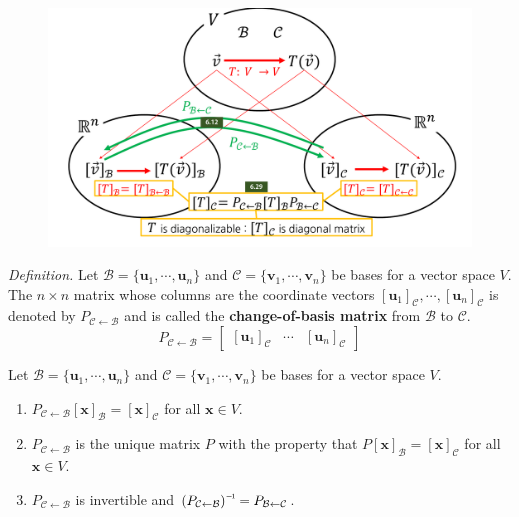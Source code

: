 \begin{figure}[H]
	\begin{center}
		\includegraphics[scale = 0.4]{Figure2.pdf}
	\end{center}
\end{figure}

\newpage
\textit{Definition.} Let $\mathcal{B} = \{ \textbf{u}_1, \cdots, \textbf{u}_n \}$ and $\mathcal{C} = \{ \textbf{v}_1, \cdots, \textbf{v}_n \}$ be bases for a vector space $V$. The $n \times n$ matrix whose columns are the coordinate vectors $[\textbf{u}_1]_\mathcal{C}, \cdots, [\textbf{u}_n]_\mathcal{C}$ is denoted by $P_{\mathcal{C} \leftarrow \mathcal{B}}$ and is called the \textbf{change-of-basis matrix} from $\mathcal{B}$ to $\mathcal{C}$. \begin{equation*}
	P_{\mathcal{C} \leftarrow \mathcal{B}} = \begin{bmatrix}
		\left [ \textbf{u}_1 \right ]_\mathcal{C} & \cdots & \left [ \textbf{u}_n \right ]_\mathcal{C}
	\end{bmatrix}
\end{equation*}

\begin{theorem}
	Let $\mathcal{B} = \{ \textbf{u}_1, \cdots, \textbf{u}_n \}$ and $\mathcal{C} = \{ \textbf{v}_1, \cdots, \textbf{v}_n \}$ be bases for a vector space $V$.
	\begin{enumerate}
		\item $P_{\mathcal{C} \leftarrow \mathcal{B}}[\textbf{x}]_\mathcal{B} = [\textbf{x}]_\mathcal{C}$ for all $\textbf{x} \in V$.
		\item $P_{ \mathcal{C} \leftarrow \mathcal{B} }$ is the unique matrix $P$ with the property that $P[\textbf{x}]_\mathcal{B} = [\textbf{x}]_\mathcal{C}$ for all $\textbf{x} \in V$.
		\item $P_{ \mathcal{C} \leftarrow \mathcal{B} }$ is invertible and $\inv{(P_{ \mathcal{C} \leftarrow \mathcal{B} })} = P_{ \mathcal{B} \leftarrow \mathcal{C} }$.
	\end{enumerate}
\end{theorem}

